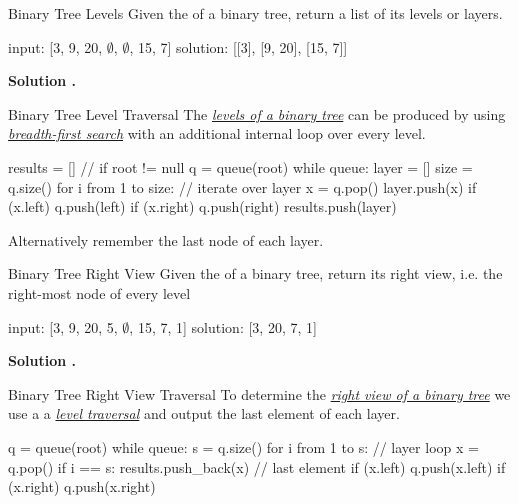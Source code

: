 \documentclass{cognito}
\begin{document}
\begin{note}{Binary Tree Levels}
	Given the  of a binary tree, return a list of its levels or layers.
	
	\begin{largecode}
 input: [3, 9, 20, $\emptyset$, $\emptyset$, 15, 7]
 solution: [[3], [9, 20], [15, 7]]
	\end{largecode}
	\bf Solution \hyperref[note:Binary Tree Level Traversal]{\solutionref}.
\end{note}

\begin{note}{Binary Tree Level Traversal}
	The \hyperref[note:Binary Tree Levels]{\it levels of a binary tree} can be produced by using \hyperref[note:Breadth-First Search]{\it breadth-first search}
	with an additional internal loop over every level.
	\begin{largecode}
 results = [] // if root != null
 q = queue(root)
 while queue:
 	layer = []
	size = q.size()
	for i from 1 to size: // iterate over layer
 		x = q.pop()
		layer.push(x)
		if (x.left) q.push(left)
		if (x.right) q.push(right)
	results.push(layer)
	\end{largecode}
	\begin{remark} Alternatively remember the last node of each layer. \end{remark}
	\vspace{-5pt}
\end{note}

\begin{note}{Binary Tree Right View}
	Given the  of a binary tree, return
	its right view, i.e. the right-most node of every level
	
	\begin{largecode}
 input: [3, 9, 20, 5, $\emptyset$, 15, 7, 1]
 solution: [3, 20, 7, 1]
	\end{largecode}
	\bf Solution \hyperref[note:Binary Tree Right View Traversal]{\solutionref}.
\end{note}

\begin{note}{Binary Tree Right View Traversal}
	To determine the \hyperref[note:Binary Tree Right View]{\it right view of a binary tree}
	we use a a \hyperref[note:Binary Tree Level Traversal]{\it level traversal} and output
	the last element of each layer.
	
	\begin{largecode}
 q = queue(root)
 while queue:
 	s = q.size()
	for i from 1 to s:	  // layer loop
		x = q.pop()
		if i == s: results.push_back(x) // last element
		if (x.left) q.push(x.left)
		if (x.right) q.push(x.right)
	\end{largecode}
	\vspace{-5pt}
\end{note}
\end{document}

